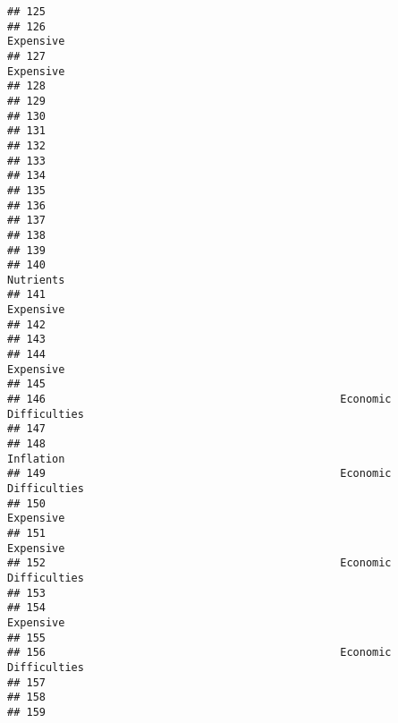 \documentclass[
]{article}
\begin{document}
\begin{verbatim}
## 125                                                                    
## 126                                                          Expensive 
## 127                                                          Expensive 
## 128                                                                    
## 129                                                                    
## 130                                                                    
## 131                                                                    
## 132                                                                    
## 133                                                                    
## 134                                                                    
## 135                                                                    
## 136                                                                    
## 137                                                                    
## 138                                                                    
## 139                                                                    
## 140                                                           Nutrients
## 141                                                          Expensive 
## 142                                                                    
## 143                                                                    
## 144                                                          Expensive 
## 145                                                                    
## 146                                              Economic Difficulties 
## 147                                                                    
## 148                                                          Inflation 
## 149                                              Economic Difficulties 
## 150                                                          Expensive 
## 151                                                          Expensive 
## 152                                              Economic Difficulties 
## 153                                                                    
## 154                                                          Expensive 
## 155                                                                    
## 156                                              Economic Difficulties 
## 157                                                                    
## 158                                                                    
## 159                                                                    

\end{verbatim}
\end{document}
